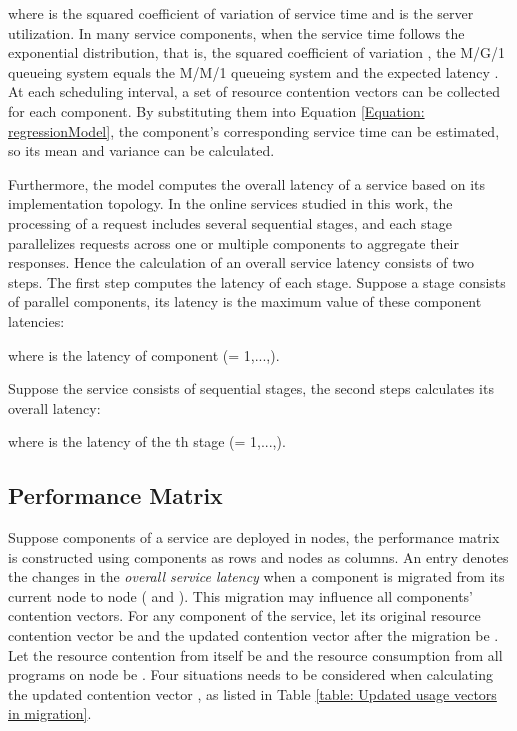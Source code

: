 \documentclass[10pt, conference, compsocconf]{IEEEtran}
\begin{document}
where  is the squared coefficient of variation of service time  and  is the server utilization. In many service components, when the service time follows the exponential distribution, that is, the squared coefficient of variation , the M/G/1 queueing system equals the M/M/1 queueing system and the expected latency .
At each scheduling interval, a set of resource contention vectors can be collected for each component. By substituting them into Equation \ref{Equation: regressionModel}, the component's corresponding service time  can be estimated, so its mean and variance can be calculated.



Furthermore, the model computes the overall latency of a service based on its implementation topology. In the online services studied in this work, the processing of a request includes several sequential stages, and each stage parallelizes requests across one or multiple components to aggregate their responses. Hence the calculation of an overall service latency consists of two steps. The first step computes the latency of each stage. Suppose a stage consists of  parallel components, its latency is the maximum value of these component latencies:

where  is the latency of component  (= 1,...,).

Suppose the service consists of  sequential stages, the second steps calculates its overall latency:

where  is the latency of the th stage (= 1,...,).
 
\subsection{Performance Matrix} \label{Section: Matrix Construction}

Suppose  components of a service are deployed in  nodes, the  performance matrix  is constructed using components as rows and nodes as columns. An entry  denotes the changes in the \emph{overall service latency}  when a component  is migrated from its current node  to node  ( and ). This migration may influence all  components' contention vectors. For any component  of the service, let its original resource contention vector be  and the updated contention vector after the migration be . Let the resource contention from  itself be  and the resource consumption from all programs on node  be .  Four situations needs to be considered when calculating the updated contention vector , as listed in Table \ref{table: Updated usage vectors in migration}.
\end{document}
